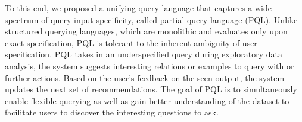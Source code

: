 \documentclass{sig-alternate-05-2015}
\begin{document}
\par To this end, we proposed a unifying query language that captures a wide spectrum of query input specificity, called partial query language (PQL). Unlike structured querying languages, which are monolithic and evaluates only upon exact specification, PQL is tolerant to the inherent ambiguity of user specification. PQL takes in an underspecified query during exploratory data analysis, the system suggests interesting relations or examples to query with or further actions. Based on the user's feedback on the seen output, the system updates the next set of recommendations. The goal of PQL is to simultaneously enable flexible querying as well as gain better understanding of the dataset to facilitate users to discover the interesting questions to ask.


\end{document}
